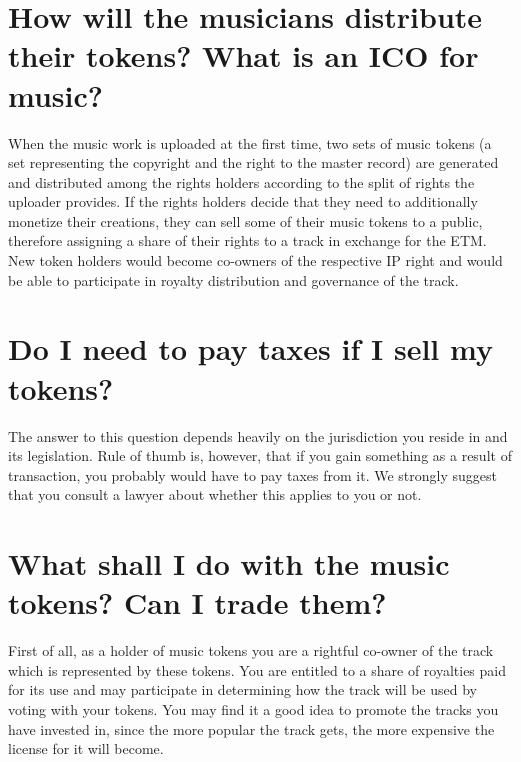 \documentclass[12pt]{report}
\begin{document}
\section{How will the musicians distribute their tokens? What is an ICO for music?}
\label{ico-distribution}
When the music work is uploaded at the first time, two sets of music
tokens (a set representing the copyright and the right to the master
record) are generated and distributed among the rights holders
according to the split of rights the uploader provides. If the rights
holders decide that they need to additionally monetize their
creations, they can sell some of their music tokens to a public,
therefore assigning a share of their rights to a track in exchange for
the ETM. New token holders would become co-owners of the
respective IP right and would be able to participate in royalty
distribution and governance of the track.

\section{Do I need to pay taxes if I sell my tokens?}
\label{ico-taxes}
The answer to this question depends heavily on the jurisdiction you
reside in and its legislation. Rule of thumb is, however, that if you
gain something as a result of transaction, you probably would have to
pay taxes from it. We strongly suggest that you consult a lawyer about
whether this applies to you or not.

\section{What shall I do with the music tokens? Can I trade them?}
\label{ico-trade}
First of all, as a holder of music tokens you are a rightful co-owner of
the track which is represented by these tokens. You are entitled to a
share of royalties paid for its use and may participate in determining
how the track will be used by voting with your tokens. You may find it
a good idea to promote the tracks you have invested in, since the more
popular the track gets, the more expensive the license for it will
become.
\end{document}
